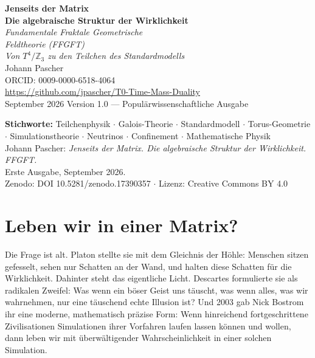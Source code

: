 \documentclass[11pt,oneside]{book}
\begin{document}
\frontmatter
\pagestyle{fancy}
\makeatletter\let\ps@plain\ps@fancy\makeatother

\begin{titlepage}
  \centering\vspace*{1.5cm}
  {\Huge\bfseries\color{blue!70!black}
    Jenseits der Matrix}\\[0.6cm]
  {\Large\bfseries\color{blue!40!black}
    Die algebraische Struktur der Wirklichkeit}\\[1cm]
  {\LARGE\itshape Fundamentale Fraktale Geometrische\\[0.2cm]
    Feldtheorie (FFGFT)}\\[0.5cm]
  {\large\itshape Von $T^4/\mathbb{Z}_3$ zu den Teilchen des Standardmodells}\\[2cm]
  {\large Johann Pascher}\\[0.3cm]
  {\normalsize ORCID: 0009-0000-6518-4064}\\[0.3cm]
  {\normalsize\url{https://github.com/jpascher/T0-Time-Mass-Duality}}\\[1.5cm]
  {\normalsize September 2026}
  \vfill{\small Version 1.0 --- Populärwissenschaftliche Ausgabe}
\end{titlepage}

\newpage\thispagestyle{empty}%
{\small\noindent\textbf{Stichworte:} Teilchenphysik $\cdot$ Galois-Theorie $\cdot$ Standardmodell $\cdot$ Torus-Geometrie $\cdot$ Simulationstheorie $\cdot$ Neutrinos $\cdot$ Confinement $\cdot$ Mathematische Physik\\[1em]
\noindent Johann Pascher: \textit{Jenseits der Matrix. Die algebraische Struktur der Wirklichkeit. FFGFT.}\\
Erste Ausgabe, September 2026.\\[0.6em]
\noindent Zenodo: DOI 10.5281/zenodo.17390357 $\cdot$ Lizenz: Creative Commons BY 4.0}

\tableofcontents
\mainmatter



\chapter{Leben wir in einer Matrix?}

Die Frage ist alt. Platon stellte sie mit dem Gleichnis der Höhle: Menschen
sitzen gefesselt, sehen nur Schatten an der Wand, und halten diese Schatten
für die Wirklichkeit. Dahinter steht das eigentliche Licht. Descartes
formulierte sie als radikalen Zweifel: Was wenn ein böser Geist uns täuscht,
was wenn alles, was wir wahrnehmen, nur eine täuschend echte Illusion ist?
Und 2003 gab Nick Bostrom ihr eine moderne, mathematisch präzise Form: Wenn
hinreichend fortgeschrittene Zivilisationen Simulationen ihrer Vorfahren
laufen lassen können und wollen, dann leben wir mit überwältigender
Wahrscheinlichkeit in einer solchen Simulation.
\end{document}
